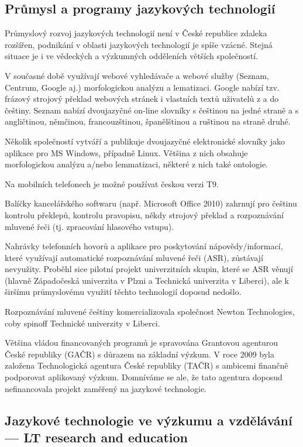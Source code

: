 \documentclass[]{../../metanetpaper}
\begin{document}
\begin{multicols}{2}
\subsection{Průmysl a programy jazykových technologií}

Průmyslový rozvoj jazykových technologií není v České republice zdaleka rozšířen, podnikání v oblasti jazykových technologií je spíše vzácné. Stejná situace je i ve vědeckých a výzkumných odděleních větších společností.

V současné době využívají webové vyhledávače a webové služby (Seznam, Centrum, Google aj.) morfologickou analýzu a lematizaci. Google nabízí tzv. frázový strojový překlad webových stránek i vlastních textů uživatelů z a do češtiny. Seznam nabízí dvoujazyčné on-line slovníky s češtinou na jedné straně a s angličtinou, němčinou, francouzštinou, španělštinou a ruštinou na straně druhé.

Několik společností vytváří a publikuje dvoujazyčné elektronické slovníky jako aplikace pro MS Windows, případně Linux. Většina z nich obsahuje morfologickou analýzu a/nebo lemmatizaci, některé z nich také ontologie.

Na mobilních telefonech je možné používat českou verzi T9.

Balíčky kancelářského softwaru (např. Microsoft Office 2010) zahrnují pro češtinu kontrolu překlepů, kontrolu pravopisu, někdy strojový překlad a rozpoznávání mluvené řeči (tj. zpracování hlasového vstupu).

Nahrávky telefonních hovorů a aplikace pro poskytování nápovědy/informací, které využívají automatické rozpoznávání mluvené řeči (ASR), zůstávají nevyužity. Proběhl sice pilotní projekt univerzitních skupin, které se ASR věnují (hlavně Západočeská univerzita v Plzni a Technická univerzita v Liberci), ale k širšímu průmyslovému využití těchto technologií doposud nedošlo.

Rozpoznávání mluvené češtiny komercializovala společnost Newton Technologies, coby spinoff Technické univerzity v Liberci.

Většina vládou financovaných programů je spravována Grantovou agenturou České republiky (GAČR) s důrazem na základní výzkum. V roce 2009 byla založena Technologická agentura České republiky (TAČR) s ambicemi finančně podporovat aplikovaný výzkum. Domníváme se ale, že tato agentura doposud nefinancovala projekt zaměřený na jazykové technologie.

\subsection{Jazykové technologie ve výzkumu a vzdělávání --- LT research and education}


\end{multicols}
\end{document}
